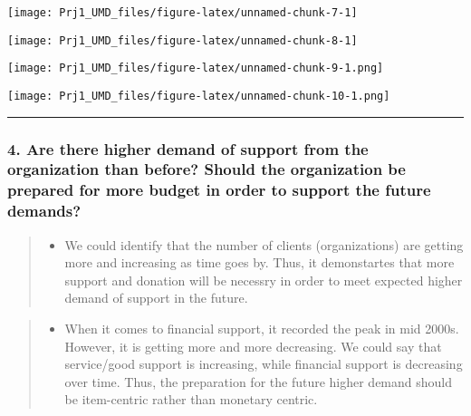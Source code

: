 \documentclass[]{article}
\providecommand{\tightlist}{%
  \setlength{\itemsep}{0pt}\setlength{\parskip}{0pt}}
\begin{document}
\begin{center}\texttt{[image: Prj1\_UMD\_files/figure-latex/unnamed-chunk-7-1]} \end{center}

\begin{center}\texttt{[image: Prj1\_UMD\_files/figure-latex/unnamed-chunk-8-1]} \end{center}

\texttt{[image: Prj1\_UMD\_files/figure-latex/unnamed-chunk-9-1.png]}

\texttt{[image: Prj1\_UMD\_files/figure-latex/unnamed-chunk-10-1.png]}

\begin{center}\rule{0.5\linewidth}{\linethickness}\end{center}

\hypertarget{are-there-higher-demand-of-support-from-the-organization-than-before-should-the-organization-be-prepared-for-more-budget-in-order-to-support-the-future-demands}{%
\subsubsection{4. Are there higher demand of support from the
organization than before? Should the organization be prepared for more
budget in order to support the future
demands?}\label{are-there-higher-demand-of-support-from-the-organization-than-before-should-the-organization-be-prepared-for-more-budget-in-order-to-support-the-future-demands}}

\begin{quote}
\begin{itemize}
\tightlist
\item
  We could identify that the number of clients (organizations) are
  getting more and increasing as time goes by. Thus, it demonstartes
  that more support and donation will be necessry in order to meet
  expected higher demand of support in the future.
\end{itemize}
\end{quote}

\begin{quote}
\begin{itemize}
\tightlist
\item
  When it comes to financial support, it recorded the peak in mid 2000s.
  However, it is getting more and more decreasing. We could say that
  service/good support is increasing, while financial support is
  decreasing over time. Thus, the preparation for the future higher
  demand should be item-centric rather than monetary centric.
\end{itemize}
\end{quote}
\end{document}
